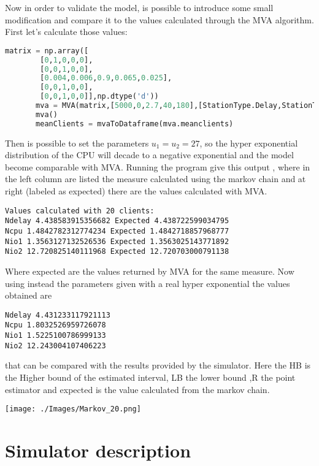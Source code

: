 \documentclass[12pt,a4paper]{article}
\begin{document}
Now in order to validate the model, is possible to introduce some small modification and compare it to the values calculated through the MVA algorithm. First let's calculate those values:
\begin{lstlisting}[language=python]
    matrix = np.array([
        [0,1,0,0,0],
        [0,0,1,0,0],
        [0.004,0.006,0.9,0.065,0.025],
        [0,0,1,0,0],
        [0,0,1,0,0]],np.dtype('d'))
       mva = MVA(matrix,[5000,0,2.7,40,180],[StationType.Delay,StationType.LoadIndependent,StationType.LoadIndependent,StationType.LoadIndependent,StationType.LoadIndependent],30)
       mva()
       meanClients = mvaToDataframe(mva.meanclients)
\end{lstlisting}
\pagebreak
Then is possible to set the parameters $u_1=u_2=27$, so the hyper exponential distribution of the CPU will decade to a negative exponential and the model become comparable with MVA. Running the program give this output , where in the left column are listed the measure calculated using the markov chain and at right (labeled as expected) there are the values calculated with MVA. 

\begin{verbatim}
Values calculated with 20 clients:
Ndelay 4.438583915356682 Expected 4.438722599034795
Ncpu 1.4842782312774234 Expected 1.4842718857968777
Nio1 1.3563127132526536 Expected 1.3563025143771892
Nio2 12.720825140111968 Expected 12.720703000791138
\end{verbatim}

Where expected are the values returned by MVA for the same measure. Now using instead the parameters given with a real hyper exponential the values obtained are 

\begin{verbatim}
Ndelay 4.431233117921113
Ncpu 1.8032526959726078 
Nio1 1.5225100786999133 
Nio2 12.243004107406223 
\end{verbatim}

that can be compared with the results provided by the simulator. Here the HB is the Higher bound of the estimated interval, LB the lower bound ,R the point estimator and expected is the value calculated from the markov chain.

\texttt{[image: ./Images/Markov\_20.png]}


\section{Simulator description}
\end{document}
